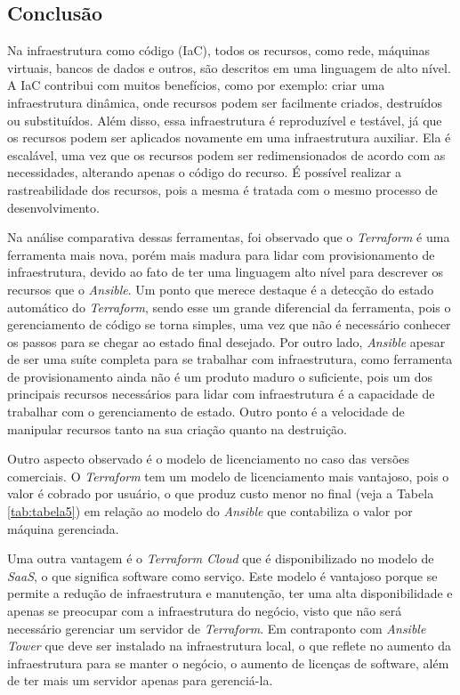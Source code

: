 \hfill

\subsection{Conclusão}
Na infraestrutura como código (IaC), todos os recursos, como rede, máquinas virtuais, bancos de dados e outros, são descritos em uma linguagem de alto nível. A IaC contribui com muitos benefícios, como por exemplo: criar uma infraestrutura dinâmica, onde recursos podem ser facilmente criados, destruídos ou substituídos. Além disso, essa infraestrutura é reproduzível e testável, já que os recursos podem ser aplicados novamente em uma infraestrutura auxiliar. Ela é escalável, uma vez que os recursos podem ser redimensionados de acordo com as necessidades, alterando apenas o código do recurso. É possível realizar a rastreabilidade dos recursos, pois a mesma é tratada com o mesmo processo de desenvolvimento. 

Na análise comparativa dessas ferramentas, foi observado que o \textit{Terraform} é uma ferramenta mais nova, porém mais madura para lidar com provisionamento de infraestrutura, devido ao fato de ter uma linguagem alto nível para descrever os recursos que o \textit{Ansible}. Um ponto que merece destaque é a detecção do estado automático do \textit{Terraform}, sendo esse um grande diferencial da ferramenta, pois o gerenciamento de código se torna simples, uma vez que não é necessário conhecer os passos para se chegar ao estado final desejado. Por outro lado,  \textit{Ansible} apesar de ser uma suíte completa para se trabalhar com infraestrutura, como ferramenta de provisionamento ainda não é um produto maduro o suficiente, pois um dos principais recursos necessários para lidar com infraestrutura é a capacidade de trabalhar com o gerenciamento de estado. Outro ponto é a velocidade de manipular recursos tanto na sua criação quanto na destruição. 

Outro aspecto observado é o modelo de licenciamento no caso das versões comerciais. O \textit{Terraform} tem um modelo de licenciamento mais vantajoso, pois o valor é cobrado por usuário, o que produz custo menor no final (veja a Tabela \ref{tab:tabela5}) em relação ao modelo do \textit{Ansible} que contabiliza o valor por máquina gerenciada. 

Uma outra vantagem é o \textit{Terraform Cloud} que é disponibilizado no modelo de \textit{SaaS}, o que significa software como serviço. Este modelo é vantajoso porque se permite a redução de infraestrutura e manutenção, ter uma alta disponibilidade e apenas se preocupar com a infraestrutura do negócio, visto que não será necessário gerenciar um servidor de \textit{Terraform}. Em contraponto com \textit{Ansible Tower} que deve ser instalado na infraestrutura local, o que reflete no aumento da infraestrutura para se manter o negócio, o aumento de licenças de software, além de ter mais um servidor apenas para gerenciá-la. 

